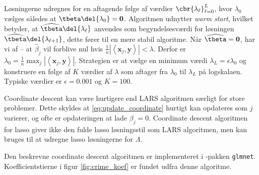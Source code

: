 %
Løsningerne udregnes for en aftagende følge af værdier \(\cbr{\lambda_{\ell}}_{\ell = 0}^L\), hvor \(\lambda_0\) vælges således at \(\hat{\tbeta} \del{\lambda_0} =\mathbf{0}\). 
Algoritmen udnytter \textit{warm start}, hvilket betyder, at \(\widehat{\tbeta} \del{\lambda_\ell}\) anvendes som begyndelsesværdi for løsningen \(\widehat{\tbeta} \del{\lambda_{\ell + 1}}\), dette fører til en mere stabil algoritme. 
Når \(\widehat{\tbeta} = \mathbf{0}\), har vi af -- at \(\hat{\beta}_j\) vil forblive nul hvis \(\frac{1}{n} \left\vert \left\langle \mathbf{x}_j, \mathbf{y} \right\rangle \right\vert < \lambda\). Derfor er \( \lambda_0 = \frac{1}{n} \max_j \left\vert \left\langle \mathbf{x}_j, \mathbf{y} \right\rangle \right\vert\).
Strategien er at vælge en minimum værdi \(\lambda_L = \epsilon \lambda_0\) og konstruere en følge af \(K\) værdier af \(\lambda\) som aftager fra \(\lambda_0\) til \(\lambda_L\) på logskalaen.
Typiske værdier er \(\epsilon = 0.001\) og \(K =100\).
%
%


Coordinate descent kan være hurtigere end LARS algoritmen særligt for store problemer.
Dette skyldes at \eqref{eq:update_coordinate} hurtigt kan opdateres som \(j\) varierer, og ofte er opdateringen at lade \(\beta_j = 0\).
Coordinate descent algoritmen for lasso giver ikke den fulde lasso løsningsstil som LARS algoritmen, men kan bruges til at udregne lasso løsningerne for \(\Lambda\).

Den beskrevne coordinate descent algoritmen er implementeret i \Rlang-pakken \texttt{glmnet}.
Koefficientstierne i figur \ref{fig:crime_koef} er fundet udfra denne algoritme.
